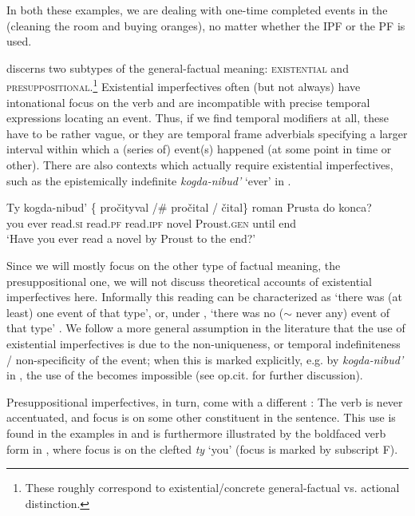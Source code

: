 \documentclass[output=paper,modfonts,newtxmath,hidelinks]{langscibook}
\begin{document}
\noindent In both these examples, we are dealing with one-time completed events in the  (cleaning the room and buying oranges), no matter whether the IPF or the PF is used.

\citet{gronndiss} discerns two subtypes of the general-factual meaning: \textsc{existential} and \textsc{presuppositional}.\footnote{These roughly correspond to  existential/concrete general-factual vs. actional distinction.} Existential imperfectives often (but not always) have intonational focus on the verb and are incompatible with precise temporal expressions locating an event. Thus, if we find temporal modifiers at all, these have to be rather vague, or they are temporal frame adverbials specifying a larger interval within which a (series of) event(s) happened (at some point in time or other). There are also contexts which actually require existential imperfectives, such as the epistemically indefinite \textit{kogda-nibud'} `ever' in .

\ea\gll Ty kogda-nibud' \{\hspace{-2pt} pročityval /\#\hspace{-2pt} pročital / čital\} roman Prusta do konca? \\
you ever {} read.\textsc{si} {} read.\textsc{pf} {} read.\textsc{ipf} novel Proust.\textsc{gen} until end\\
\glt `Have you ever read a novel by Proust to the end?' \hfill \citep[][73]{gronndiss}\label{Proust}
\z

\noindent Since we will mostly focus on the other type of factual meaning, the presuppositional one, we will not discuss theoretical accounts of existential imperfectives here. Informally this reading can be characterized as `there was (at least) one event of that type', or, under , `there was no ($\sim$ never any) event of that type' \citep[see][]{mehlig01, mehlig13, muellerkrat, muellerPI, gehrkemueller}. We follow a more general assumption in the literature that the use of existential imperfectives is due to the non-uniqueness, or temporal indefiniteness / non-specificity of the event; when this is marked explicitly, e.g. by \textit{kogda-nibud'} in , the use of the  becomes impossible (see op.cit. for further discussion). 

Presuppositional imperfectives, in turn, come with a different : The verb is never accentuated, and  focus is on some other constituent in the sentence. This  use is found in the examples in  and is furthermore illustrated by the boldfaced verb form in , where focus is on the clefted  \textit{ty} `you' (focus is marked by subscript F).
\end{document}
